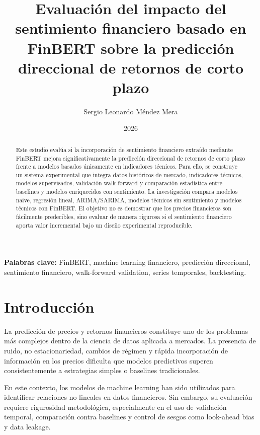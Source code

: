 \documentclass[12pt,a4paper]{article}
\title{
Evaluación del impacto del sentimiento financiero basado en FinBERT sobre la predicción direccional de retornos de corto plazo
}
\author{
Sergio Leonardo Méndez Mera
}
\date{2026}
\begin{document}

\maketitle

\begin{abstract}
Este estudio evalúa si la incorporación de sentimiento financiero extraído mediante FinBERT mejora significativamente la predicción direccional de retornos de corto plazo frente a modelos basados únicamente en indicadores técnicos. Para ello, se construye un sistema experimental que integra datos históricos de mercado, indicadores técnicos, modelos supervisados, validación walk-forward y comparación estadística entre baselines y modelos enriquecidos con sentimiento. La investigación compara modelos naive, regresión lineal, ARIMA/SARIMA, modelos técnicos sin sentimiento y modelos técnicos con FinBERT. El objetivo no es demostrar que los precios financieros son fácilmente predecibles, sino evaluar de manera rigurosa si el sentimiento financiero aporta valor incremental bajo un diseño experimental reproducible.
\end{abstract}

\textbf{Palabras clave:} FinBERT, machine learning financiero, predicción direccional, sentimiento financiero, walk-forward validation, series temporales, backtesting.

\newpage

\tableofcontents

\newpage

\section{Introducción}

La predicción de precios y retornos financieros constituye uno de los problemas más complejos dentro de la ciencia de datos aplicada a mercados. La presencia de ruido, no estacionariedad, cambios de régimen y rápida incorporación de información en los precios dificulta que modelos predictivos superen consistentemente a estrategias simples o baselines tradicionales.

En este contexto, los modelos de machine learning han sido utilizados para identificar relaciones no lineales en datos financieros. Sin embargo, su evaluación requiere rigurosidad metodológica, especialmente en el uso de validación temporal, comparación contra baselines y control de sesgos como look-ahead bias y data leakage.
\end{document}
